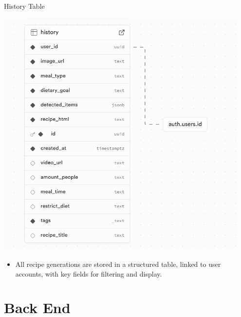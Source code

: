 \documentclass{beamer}
\begin{document}
\begin{frame}{History Table}
    \begin{center}
        \includegraphics[width=0.95\textwidth,height=0.58\textheight,keepaspectratio]{table.png}
    \end{center}
    \vspace{2mm}
    \begin{itemize}
        \item \small All recipe generations are stored in a structured table, linked to user accounts, with key fields for filtering and display.
    \end{itemize}
\end{frame}


\section{Back End}
\end{document}
